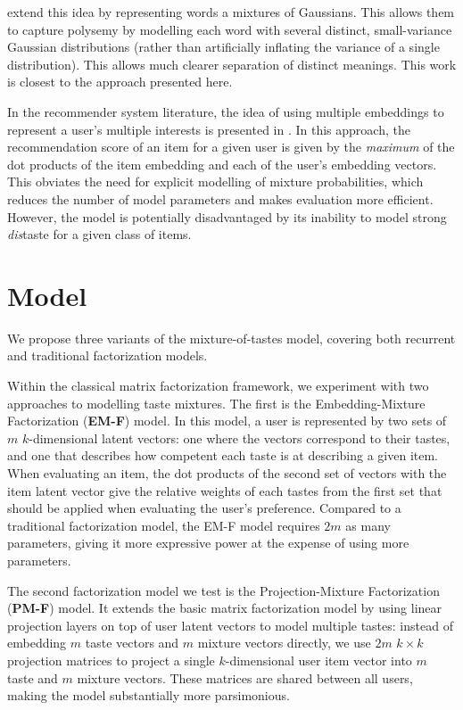 \documentclass[sigconf]{acmart}
\begin{document}
\citet{athiwaratkun2017multimodal} extend this idea by representing words a mixtures of Gaussians. This allows them to capture polysemy by modelling each word with several distinct, small-variance Gaussian distributions (rather than artificially inflating the variance of a single distribution). This allows much clearer separation of distinct meanings. This work is closest to the approach presented here.

In the recommender system literature, the idea of using multiple embeddings to represent a user's multiple interests is presented in \citet{weston2013nonlinear}. In this approach, the recommendation score of an item for a given user is given by the \emph{maximum} of the dot products of the item embedding and each of the user's embedding vectors. This obviates the need for explicit modelling of mixture probabilities, which reduces the number of model parameters and makes evaluation more efficient. However, the model is potentially disadvantaged by its inability to model strong \emph{dis}taste for a given class of items.

\section{Model}
We propose three variants of the mixture-of-tastes model, covering both recurrent and traditional factorization models.

Within the classical matrix factorization framework, we experiment with two approaches to modelling taste mixtures. The first is the Embedding-Mixture Factorization (\textbf{EM-F}) model. In this model, a user is represented by two sets of $m$ $k$-dimensional latent vectors: one where the vectors correspond to their tastes, and one that describes how competent each taste is at describing a given item. When evaluating an item, the dot products of the second set of vectors with the item latent vector give the relative weights of each tastes from the first set that should be applied when evaluating the user's preference. Compared to a traditional factorization model, the EM-F model requires $2m$ as many parameters, giving it more expressive power at the expense of using more parameters.

The second factorization model we test is the Projection-Mixture Factorization (\textbf{PM-F}) model. It extends the basic matrix factorization model by using linear projection layers on top of user latent vectors to model multiple tastes: instead of embedding $m$ taste vectors and $m$ mixture vectors directly, we use $2m$ $k \times k$ projection matrices to project a single $k$-dimensional user item vector into $m$ taste and $m$ mixture vectors. These matrices are shared between all users, making the model substantially more parsimonious.
\end{document}
